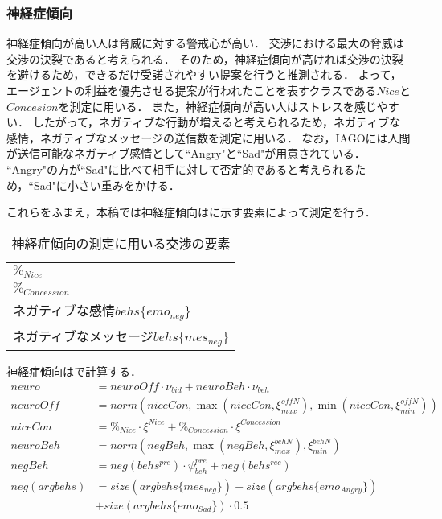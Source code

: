 \subsubsection{神経症傾向}
神経症傾向が高い人は脅威に対する警戒心が高い．
交渉における最大の脅威は交渉の決裂であると考えられる．
そのため，神経症傾向が高ければ交渉の決裂を避けるため，できるだけ受諾されやすい提案を行うと推測される．
よって，エージェントの利益を優先させる提案が行われたことを表すクラスである$Nice$と$Concesion$を測定に用いる．
また，神経症傾向が高い人はストレスを感じやすい．
したがって，ネガティブな行動が増えると考えられるため，ネガティブな感情，ネガティブなメッセージの送信数を測定に用いる．
なお，IAGOには人間が送信可能なネガティブ感情として``Angry"と``Sad"が用意されている．
``Angry"の方が``Sad"に比べて相手に対して否定的であると考えられるため，``Sad"に小さい重みをかける．

これらをふまえ，本稿では神経症傾向はに示す要素によって測定を行う．

\begin{table}[tb]
    \centering
    \caption{神経症傾向の測定に用いる交渉の要素}
    \begin{tabular}{l} \toprule
        $\%_{Nice}$ \\
        $\%_{Concession}$ \\
        ネガティブな感情$behs\{emo_{neg}\}$ \\
        ネガティブなメッセージ$behs\{mes_{neg}\}$ \\ \bottomrule
    \end{tabular}
    \label{tab:neuroticism}
\end{table}

神経症傾向はで計算する．
\begin{align}
    neuro &= \mathit{neuroOff} \cdot \nu_{\mathit{bid}} + neuroBeh \cdot \nu_{beh} \label{eq:neuroticism} \\
    \mathit{neuroOff} &= norm\left(niceCon, \max \left( niceCon, \xi_{max}^{\mathit{offN}}\right) , \min \left(niceCon, \xi_{min}^{\mathit{offN}}\right) \right) \nonumber \\
    niceCon &= \%_{Nice} \cdot \xi^{\mathit{Nice}} + \%_{Concession} \cdot \xi^{\mathit{Concession}} \nonumber \\
    neuroBeh &= norm\left( negBeh, \max \left( negBeh, \xi_{max}^{\mathit{behN}}\right), \xi_{min}^{\mathit{behN}} \right) \nonumber \\
    negBeh &=  neg(behs^{pre}) \cdot \psi_{beh}^{pre} + neg(behs^{rec}) \nonumber \\
    neg(argbehs) &= size(argbehs\{mes_{neg}\}) + size(argbehs\{emo_{Angry}\}) \nonumber \\
    &+ size(argbehs\{emo_{Sad}\}) \cdot 0.5 \nonumber 
\end{align}

